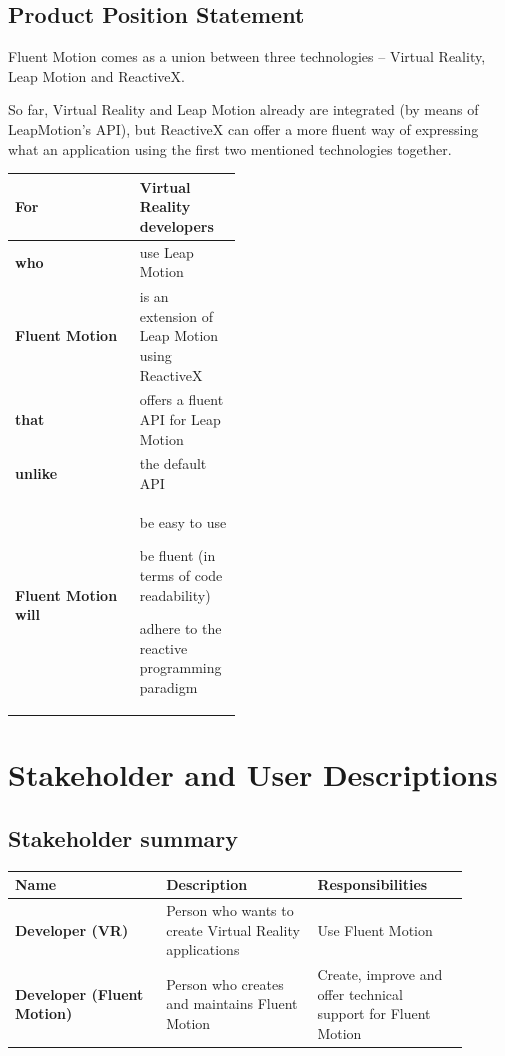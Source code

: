 \documentclass[12pt,a4paper,twoside]{report}
\begin{document}
\subsection{Product Position Statement}
Fluent Motion comes as a union between three technologies – Virtual Reality, Leap Motion and ReactiveX.

So far, Virtual Reality and Leap Motion already are integrated (by means of LeapMotion’s API), but ReactiveX can offer a more fluent way of expressing what an application using the first two mentioned technologies together. 

\begin{table}[h]
  \centering
  \begin{tabular}{| g | m{0.45\linewidth} |}
    \hline
    \textbf{For} & Virtual Reality developers \\
    \hline
    \textbf{who} & use Leap Motion \\
    \hline
    \textbf{Fluent Motion} & is an extension of Leap Motion using ReactiveX \\
    \hline
    \textbf{that} & offers a fluent API for Leap Motion \\
    \hline
    \textbf{unlike} & the default API \\
    \hline
    \textbf{Fluent Motion will} &
      be easy to use    
      
      be fluent (in terms of code readability)

      adhere to the reactive programming paradigm \\
    \hline
  \end{tabular}
  \label{table:problem_statement}
\end{table}

\section{Stakeholder and User Descriptions}

\subsection{Stakeholder summary}

\begin{table}[h]
  \centering
  \begin{tabular}{| m{0.3\linewidth} | m{0.3\linewidth} | m{0.3\linewidth} |}
    \hline
    \rowcolor{lightgray} Name & Description & Responsibilities \\
    \hline
    \textbf{Developer (VR)} & Person who wants to create Virtual Reality applications & Use Fluent Motion \\
    \hline
    \textbf{Developer (Fluent Motion)} & Person who creates and maintains Fluent Motion & Create, improve and offer technical support for Fluent Motion \\
    \hline
  \end{tabular}
\end{table}
\end{document}
